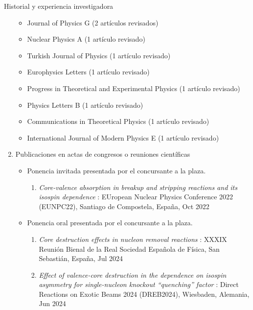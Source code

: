 \documentclass{resume2} %
\begin{document}
\begin{rSection}{Historial y experiencia investigadora}
\begin{enumerate}[label=\alph*.]
\begin{itemize}
\item Journal of Physics G (2 art\'iculos revisados)

\item Nuclear Physics A (1 art\'iculo revisado)

\item Turkish Journal of Physics (1 art\'iculo revisado)

\item Europhysics Letters (1 art\'iculo revisado)

\item Progress in Theoretical and Experimental Physics (1 art\'iculo revisado)

\item Physics Letters B (1 art\'iculo revisado)

\item Communications in Theoretical Physics (1 art\'iculo revisado)

\item International Journal of Modern Physics E (1 art\'iculo revisado)

\end{itemize}

\item Publicaciones en actas de congresos o reuniones científicas

\begin{itemize}
\item Ponencia invitada presentada por el concursante a la plaza.
\begin{enumerate}[label=\arabic*.]
\item {\it Core-valence absorption in breakup and stripping reactions and its
isospin dependence} 
: EUropean Nuclear Physics Conference 2022 (EUNPC22), Santiago de Compostela, Espa\~na, Oct 2022
\end{enumerate}

\item Ponencia oral presentada por el concursante a la plaza.

\begin{enumerate}[label=\arabic*.]

\item {\it Core destruction effects in nucleon removal reactions} 
: XXXIX Reuni\'on Bienal de la Real Sociedad Española de F\'isica, San Sebasti\'an, Espa\~na, Jul 2024

\item {\it Effect of valence-core destruction in the dependence on isospin asymmetry for single-nucleon knockout “quenching” factor} 
: Direct Reactions on Exotic Beams 2024 (DREB2024), Wiesbaden, Alemania, Jun 2024




\end{enumerate}
\end{itemize}
\end{enumerate}
\end{rSection}
\end{document}
